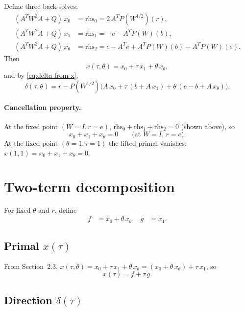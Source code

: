 \documentclass{article}
\newcommand{\PW}{P(W^{1/2})}
\newcommand{\Psq}{P(W)}
\begin{document}
Define three back-solves:
\begin{align}
  (A^T W^2 A + Q)\,x_0 &= \text{rhs}_0 = 2\,A^T \PW(r), \label{eq:x0}\\
  (A^T W^2 A + Q)\,x_1 &= \text{rhs}_1 = -c - A^T \Psq(b), \label{eq:x1}\\
  (A^T W^2 A + Q)\,x_\theta &= \text{rhs}_2 = c - A^T e + A^T\Psq(b) - A^T\Psq(e). \label{eq:xtheta}
\end{align}
Then
\[
  x(\tau,\theta) = x_0 + \tau\,x_1 + \theta\,x_\theta,
\]
and by \eqref{eq:delta-from-x},
\[
  \delta(\tau,\theta) = r - \PW\bigl(A\,x_0 + \tau\,(b + A\,x_1) + \theta\,(e - b + A\,x_\theta)\bigr).
\]

\paragraph{Cancellation property.}
At the fixed point $(W=I, r=e)$,
$\text{rhs}_0 + \text{rhs}_1 + \text{rhs}_2 = 0$ (shown above), so
\begin{equation}\label{eq:cancel}
  x_0 + x_1 + x_\theta = 0 \qquad\text{(at $W=I$, $r=e$)}.
\end{equation}
At the fixed point $(\theta=1, \tau=1)$ the lifted primal
vanishes: $x(1,1) = x_0 + x_1 + x_\theta = 0$.

\section{Two-term decomposition}

For fixed $\theta$ and $r$, define
\begin{align}
  f &= x_0 + \theta\,x_\theta, & g &= x_1. \label{eq:fg}
\end{align}

\subsection{Primal $x(\tau)$}

From Section~2.3, $x(\tau,\theta) = x_0 + \tau\,x_1 + \theta\,x_\theta
= (x_0 + \theta\,x_\theta) + \tau\,x_1$, so
\begin{equation}\label{eq:xtau}
  \boxed{x(\tau) = f + \tau\,g.}
\end{equation}

\subsection{Direction $\delta(\tau)$}
\end{document}
